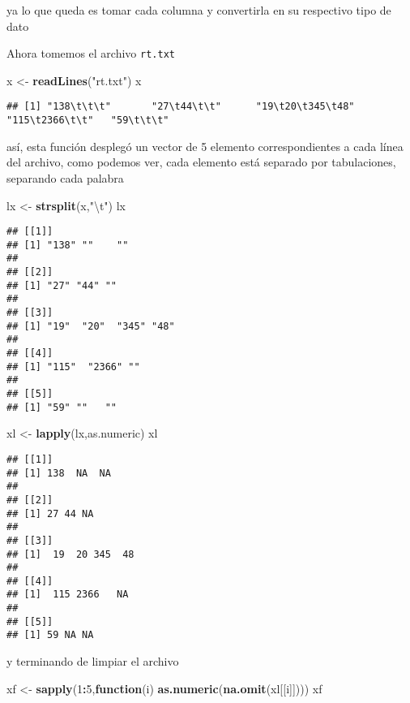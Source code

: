 \documentclass[]{article}
\newenvironment{Shaded}{\begin{snugshade}}{\end{snugshade}}
\newcommand{\KeywordTok}[1]{\textcolor[rgb]{0.13,0.29,0.53}{\textbf{#1}}}
\newcommand{\DecValTok}[1]{\textcolor[rgb]{0.00,0.00,0.81}{#1}}
\newcommand{\CharTok}[1]{\textcolor[rgb]{0.31,0.60,0.02}{#1}}
\newcommand{\StringTok}[1]{\textcolor[rgb]{0.31,0.60,0.02}{#1}}
\newcommand{\ControlFlowTok}[1]{\textcolor[rgb]{0.13,0.29,0.53}{\textbf{#1}}}
\newcommand{\OperatorTok}[1]{\textcolor[rgb]{0.81,0.36,0.00}{\textbf{#1}}}
\newcommand{\NormalTok}[1]{#1}
\begin{document}
ya lo que queda es tomar cada columna y convertirla en su respectivo
tipo de dato

Ahora tomemos el archivo \texttt{rt.txt}

\begin{Shaded}
\begin{Highlighting}[]
\NormalTok{x <-}\StringTok{ }\KeywordTok{readLines}\NormalTok{(}\StringTok{"rt.txt"}\NormalTok{)}
\NormalTok{x}
\end{Highlighting}
\end{Shaded}

\begin{verbatim}
## [1] "138\t\t\t"       "27\t44\t\t"      "19\t20\t345\t48" "115\t2366\t\t"   "59\t\t\t"
\end{verbatim}

así, esta función desplegó un vector de 5 elemento correspondientes a
cada línea del archivo, como podemos ver, cada elemento está separado
por tabulaciones, separando cada palabra

\begin{Shaded}
\begin{Highlighting}[]
\NormalTok{lx <-}\StringTok{ }\KeywordTok{strsplit}\NormalTok{(x,}\StringTok{"}\CharTok{\textbackslash{}t}\StringTok{"}\NormalTok{)}
\NormalTok{lx}
\end{Highlighting}
\end{Shaded}

\begin{verbatim}
## [[1]]
## [1] "138" ""    ""   
## 
## [[2]]
## [1] "27" "44" ""  
## 
## [[3]]
## [1] "19"  "20"  "345" "48" 
## 
## [[4]]
## [1] "115"  "2366" ""    
## 
## [[5]]
## [1] "59" ""   ""
\end{verbatim}

\begin{Shaded}
\begin{Highlighting}[]
\NormalTok{xl <-}\StringTok{ }\KeywordTok{lapply}\NormalTok{(lx,as.numeric)}
\NormalTok{xl}
\end{Highlighting}
\end{Shaded}

\begin{verbatim}
## [[1]]
## [1] 138  NA  NA
## 
## [[2]]
## [1] 27 44 NA
## 
## [[3]]
## [1]  19  20 345  48
## 
## [[4]]
## [1]  115 2366   NA
## 
## [[5]]
## [1] 59 NA NA
\end{verbatim}

y terminando de limpiar el archivo

\begin{Shaded}
\begin{Highlighting}[]
\NormalTok{xf <-}\StringTok{ }\KeywordTok{sapply}\NormalTok{(}\DecValTok{1}\OperatorTok{:}\DecValTok{5}\NormalTok{,}\ControlFlowTok{function}\NormalTok{(i) }\KeywordTok{as.numeric}\NormalTok{(}\KeywordTok{na.omit}\NormalTok{(xl[[i]])))}
\NormalTok{xf}
\end{Highlighting}
\end{Shaded}
\end{document}
